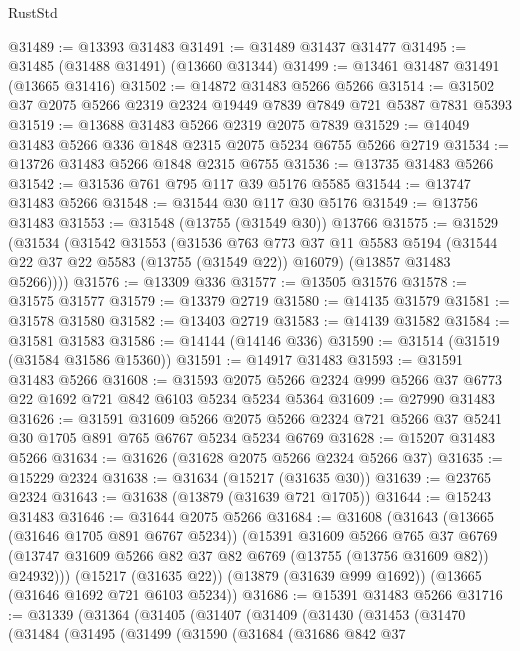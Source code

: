 \begin{lexlean}{RustStd}
\begin{coremodule}
@31489 := @13393 @31483
@31491 := @31489 @31437 @31477
@31495 := @31485 (@31488 @31491) (@13660 @31344)
@31499 := @13461 @31487 @31491 (@13665 @31416)
@31502 := @14872 @31483 @5266 @5266
@31514 := @31502 @37 @2075 @5266 @2319 @2324 @19449 @7839 @7849 @721 @5387 @7831 @5393
@31519 := @13688 @31483 @5266 @2319 @2075 @7839
@31529 := @14049 @31483 @5266 @336 @1848 @2315 @2075 @5234 @6755 @5266 @2719
@31534 := @13726 @31483 @5266 @1848 @2315 @6755
@31536 := @13735 @31483 @5266
@31542 := @31536 @761 @795 @117 @39 @5176 @5585
@31544 := @13747 @31483 @5266
@31548 := @31544 @30 @117 @30 @5176
@31549 := @13756 @31483
@31553 := @31548 (@13755 (@31549 @30)) @13766
@31575 := @31529
    (@31534
      (@31542
        @31553
        (@31536
          @763
          @773
          @37
          @11
          @5583
          @5194
          (@31544 @22 @37 @22 @5583 (@13755 (@31549 @22)) @16079)
          (@13857 @31483 @5266))))
@31576 := @13309 @336
@31577 := @13505 @31576
@31578 := @31575 @31577
@31579 := @13379 @2719
@31580 := @14135 @31579
@31581 := @31578 @31580
@31582 := @13403 @2719
@31583 := @14139 @31582
@31584 := @31581 @31583
@31586 := @14144 (@14146 @336)
@31590 := @31514 (@31519 (@31584 @31586 @15360))
@31591 := @14917 @31483
@31593 := @31591 @31483 @5266
@31608 := @31593 @2075 @5266 @2324 @999 @5266 @37 @6773 @22 @1692 @721 @842 @6103 @5234 @5234 @5364
@31609 := @27990 @31483
@31626 := @31591
    @31609
    @5266
    @2075
    @5266
    @2324
    @721
    @5266
    @37
    @5241
    @30
    @1705
    @891
    @765
    @6767
    @5234
    @5234
    @6769
@31628 := @15207 @31483 @5266
@31634 := @31626 (@31628 @2075 @5266 @2324 @5266 @37)
@31635 := @15229 @2324
@31638 := @31634 (@15217 (@31635 @30))
@31639 := @23765 @2324
@31643 := @31638 (@13879 (@31639 @721 @1705))
@31644 := @15243 @31483
@31646 := @31644 @2075 @5266
@31684 := @31608
    (@31643
      (@13665 (@31646 @1705 @891 @6767 @5234))
      (@15391
        @31609
        @5266
        @765
        @37
        @6769
        (@13747 @31609 @5266 @82 @37 @82 @6769 (@13755 (@13756 @31609 @82)) @24932)))
    (@15217 (@31635 @22))
    (@13879 (@31639 @999 @1692))
    (@13665 (@31646 @1692 @721 @6103 @5234))
@31686 := @15391 @31483 @5266
@31716 := @31339
    (@31364
      (@31405
        (@31407
          (@31409
            (@31430
              (@31453
                (@31470
                  (@31484
                    (@31495
                      (@31499
                        (@31590
                          (@31684
                            (@31686
                              @842
                              @37

\end{coremodule}
\end{lexlean}
